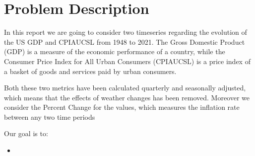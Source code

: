 \section{Problem Description}
In this report we are going to consider two timeseries regarding the evolution of the US GDP and CPIAUCSL from 1948 to 2021.
The Gross Domestic Product (GDP) is a measure of the economic performance of a country, while the Consumer Price Index for All Urban Consumers (CPIAUCSL) is a price index of a basket of goods and services paid by urban consumers.

Both these two metrics have been calculated quarterly and seasonally adjusted, which means that the effects of weather changes has been removed. Moreover we consider the Percent Change for the values, which measures the inflation rate between any two time periods

Our goal is to:
\begin{itemize}
    \item
\end{itemize}